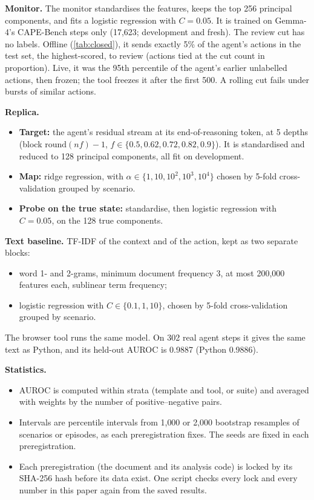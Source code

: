 \textbf{Monitor.} The monitor standardises the features, keeps the top 256 principal components, and fits a logistic
regression with $C=0.05$. It is trained on Gemma-4's CAPE-Bench steps only (17{,}623; development and fresh). The
review cut has no labels. Offline (\cref{tab:closed}), it sends exactly 5\% of the agent's actions in the test set, the
highest-scored, to review (actions tied at the cut count in proportion). Live, it was the 95th percentile of
the agent's earlier unlabelled actions, then frozen; the tool freezes it after the first 500. A rolling cut fails under
bursts of similar actions.

\textbf{Replica.}
\begin{itemize}
\item \textbf{Target:} the agent's residual stream at its end-of-reasoning token, at 5 depths (block $\mathrm{round}(nf)-1$, $f\in\{0.5,0.62,0.72,0.82,0.9\}$). It is standardised and reduced to 128 principal components, all fit on development.
\item \textbf{Map:} ridge regression, with $\alpha\in\{1,10,10^2,10^3,10^4\}$ chosen by 5-fold cross-validation grouped by scenario.
\item \textbf{Probe on the true state:} standardise, then logistic regression with $C=0.05$, on the 128 true components.
\end{itemize}

\textbf{Text baseline.} TF-IDF of the context and of the action, kept as two separate blocks:
\begin{itemize}
\item word 1- and 2-grams, minimum document frequency 3, at most 200{,}000 features each, sublinear term frequency;
\item logistic regression with $C\in\{0.1,1,10\}$, chosen by 5-fold cross-validation grouped by scenario.
\end{itemize}
The browser tool runs the same model. On 302 real agent steps it gives the same text as Python, and its held-out AUROC is 0.9887 (Python 0.9886).

\textbf{Statistics.}
\begin{itemize}
\item AUROC is computed within strata (template and tool, or suite) and averaged with weights by the number of positive--negative pairs.
\item Intervals are percentile intervals from 1{,}000 or 2{,}000 bootstrap resamples of scenarios or episodes, as each preregistration fixes. The seeds are fixed in each preregistration.
\item Each preregistration (the document and its analysis code) is locked by its SHA-256 hash before its data exist. One script checks every lock and every number in this paper again from the saved results.
\end{itemize}

